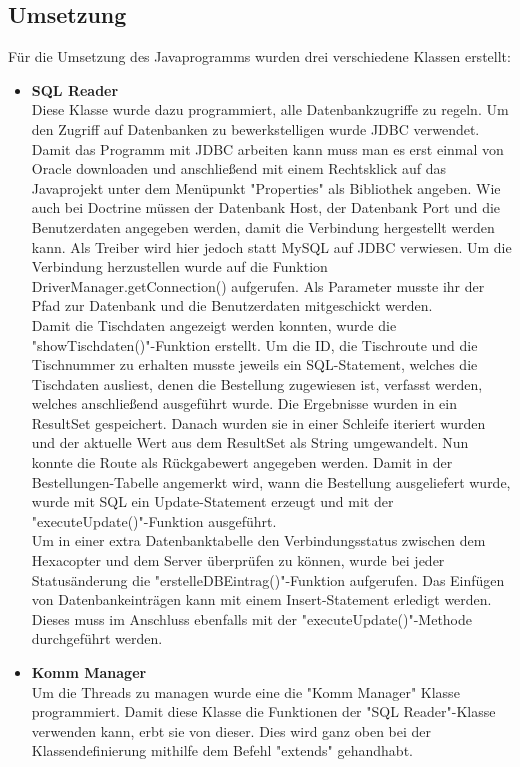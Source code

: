   \subsection{Umsetzung}
Für die Umsetzung des Javaprogramms wurden drei verschiedene Klassen erstellt:
\begin{itemize}
    \item \textbf{SQL Reader}\\
Diese Klasse wurde dazu programmiert, alle Datenbankzugriffe zu regeln.
Um den Zugriff auf Datenbanken zu bewerkstelligen wurde JDBC verwendet. 
Damit das Programm mit JDBC arbeiten kann muss man es erst einmal von Oracle downloaden und anschließend mit einem Rechtsklick auf das Javaprojekt unter dem Menüpunkt "Properties" als Bibliothek angeben.
Wie auch bei Doctrine müssen der Datenbank Host, der Datenbank Port und die Benutzerdaten angegeben werden, damit die Verbindung hergestellt werden kann.
Als Treiber wird hier jedoch statt MySQL auf JDBC verwiesen. 
Um die Verbindung herzustellen wurde auf die Funktion DriverManager.getConnection() aufgerufen. Als Parameter musste ihr der Pfad zur Datenbank und die Benutzerdaten mitgeschickt werden.
\\
Damit die Tischdaten angezeigt werden konnten, wurde die "showTischdaten()"-Funktion erstellt. Um die ID, die Tischroute und die Tischnummer zu erhalten musste jeweils ein SQL-Statement, welches die Tischdaten ausliest, denen die Bestellung zugewiesen ist, verfasst werden, welches anschließend ausgeführt wurde.
Die Ergebnisse wurden in ein ResultSet gespeichert. Danach wurden sie in einer Schleife iteriert wurden und der aktuelle Wert aus dem ResultSet als String umgewandelt. Nun konnte die Route als Rückgabewert angegeben werden. Damit in der Bestellungen-Tabelle angemerkt wird, wann die Bestellung ausgeliefert wurde, wurde mit SQL ein Update-Statement erzeugt und mit der "executeUpdate()"-Funktion ausgeführt.
\\
Um in einer extra Datenbanktabelle den Verbindungsstatus zwischen dem Hexacopter und dem Server überprüfen zu können, wurde bei jeder Statusänderung die "erstelleDBEintrag()"-Funktion aufgerufen. Das Einfügen von Datenbankeinträgen kann mit einem Insert-Statement erledigt werden. Dieses muss im Anschluss ebenfalls mit der "executeUpdate()"-Methode durchgeführt werden.
    \item \textbf{Komm Manager}\\
Um die Threads zu managen wurde eine die "Komm Manager" Klasse programmiert.
Damit diese Klasse die Funktionen der "SQL Reader"-Klasse verwenden kann, erbt sie von dieser. Dies wird ganz oben bei der Klassendefinierung mithilfe dem Befehl "extends" gehandhabt. 

\end{itemize}
